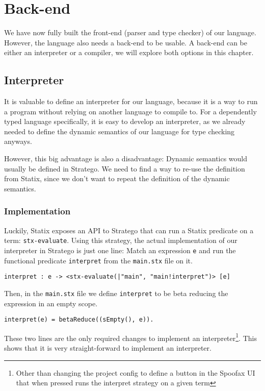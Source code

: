 \chapter{Back-end}
\label{ch:backend}

We have now fully built the front-end (parser and type checker) of our language. However, the language also needs a back-end to be usable. A back-end can be either an interpreter or a compiler, we will explore both options in this chapter.

\section{Interpreter}
It is valuable to define an interpreter for our language, because it is a way to run a program without relying on another language to compile to. For a dependently typed language specifically, it is easy to develop an interpreter, as we already needed to define the dynamic semantics of our language for type checking anyways. 

However, this big advantage is also a disadvantage: Dynamic semantics would usually be defined in Stratego. We need to find a way to re-use the definition from Statix, since we don't want to repeat the definition of the dynamic semantics.

\subsection{Implementation}

Luckily, Statix exposes an API to Stratego that can run a Statix predicate on a term: \verb|stx-evaluate|. Using this strategy, the actual implementation of our interpreter in Stratego is just one line: Match an expression \verb|e| and run the functional predicate \verb|interpret| from the \verb|main.stx| file on it.

\begin{lstlisting}
interpret : e -> <stx-evaluate(|"main", "main!interpret")> [e]
\end{lstlisting}

Then, in the \verb|main.stx| file we define \verb|interpret| to be beta reducing the expression in an empty scope. 

\begin{lstlisting}
interpret(e) = betaReduce((sEmpty(), e)).
\end{lstlisting}

These two lines are the only required changes to implement an interpreter\footnote{Other than changing the project config to define a button in the Spoofax UI that when pressed runs the interpret strategy on a given term}. This shows that it is very straight-forward to implement an interpreter. 

